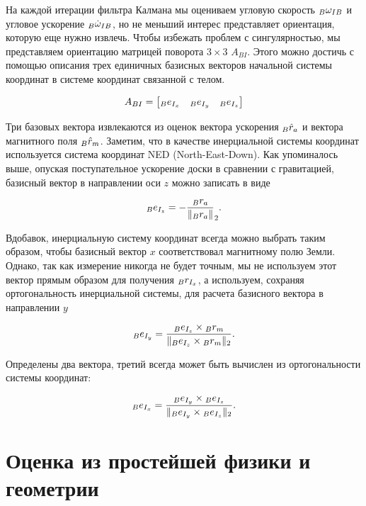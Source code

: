 \documentclass[12pt,a4paper]{article}
\begin{document}
На каждой итерации фильтра Калмана мы оцениваем угловую скорость ${\vphantom \omega}_B \omega_{IB}$ и угловое ускорение ${\vphantom \omega}_B \dot\omega_{IB}$, но не меньший интерес представляет ориентация, которую еще нужно извлечь. Чтобы избежать проблем с сингулярностью, мы представляем ориентацию матрицей поворота $3 \times 3$ $A_{BI}$. Этого можно достичь с помощью описания трех единичных базисных векторов начальной системы координат в системе координат связанной с телом. 

$$ A_{BI} = 
	\begin{bmatrix} 
		{\vphantom e}_B e_{I_x} & {\vphantom e}_B e_{I_y} & {\vphantom e}_B e_{I_z} \\
	\end{bmatrix}
$$

Три базовых вектора извлекаются из оценок вектора ускорения ${\vphantom r}_B \hat r_a$ и вектора магнитного поля ${\vphantom r}_B \hat r_m$. Заметим, что в качестве инерциальной системы координат используется система координат NED (North-East-Down). Как упоминалось выше, опуская поступательное ускорение доски в сравнении с гравитацией, базисный вектор в направлении оси $z$ можно записать в виде

$$ {\vphantom e}_B e_{I_z} = -\frac{{\vphantom r}_B r_a}{\|{\vphantom r}_B r_a\|}_2 .$$

Вдобавок, инерциальную систему координат всегда можно выбрать таким образом, чтобы базисный вектор $x$ соответствовал магнитному полю Земли. Однако, так как измерение никогда не будет точным, мы не используем этот вектор прямым образом для получения ${\vphantom r}_B r_{I_x}$, а используем, сохраняя ортогональность инерциальной системы, для расчета базисного вектора в направлении $y$

$$ {\vphantom e}_B e_{I_y} = \frac{{\vphantom e}_B e_{I_z} \times {\vphantom r}_B r_m}{\| {\vphantom e}_B e_{I_z} \times {\vphantom r}_B r_m\|_2} .$$

Определены два вектора, третий всегда может быть вычислен из ортогональности системы координат:

$$ {\vphantom e}_B e_{I_x} = \frac{{\vphantom e}_B e_{I_y} \times {\vphantom e}_B e_{I_z}}
	{\| {\vphantom e}_B e_{I_y} \times {\vphantom e}_B e_{I_z} \|_2} .$$

\section{Оценка из простейшей физики и геометрии}
\end{document}
